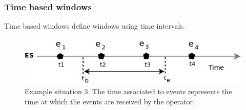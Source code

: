  \subsubsection{Time based windows}
Time based windows define windows using time intervals.
\begin{figure}[h]
  \begin{center}
    \includegraphics[scale=0.65]{chap3/images/winwithinExample.jpeg}
  \end{center}
  \caption{Example situation 3. The time associated to events represents the time at which the events are received by the operator.}
  \label{fig:op_winwithin_exple}
\end{figure}
